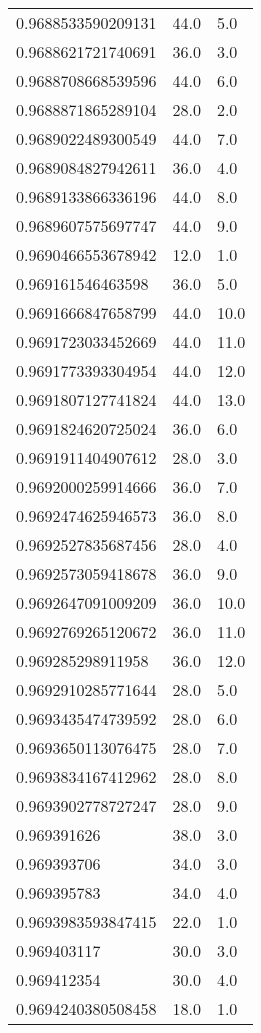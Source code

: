 \begin{center}
\begin{supertabular}[H]{p{0.30\textwidth}p{0.05\textwidth}p{0.05\textwidth}}
0.9688533590209131 & 44.0 & 5.0 \\ 
0.9688621721740691 & 36.0 & 3.0 \\ 
0.9688708668539596 & 44.0 & 6.0 \\ 
0.9688871865289104 & 28.0 & 2.0 \\ 
0.9689022489300549 & 44.0 & 7.0 \\ 
0.9689084827942611 & 36.0 & 4.0 \\ 
0.9689133866336196 & 44.0 & 8.0 \\ 
0.9689607575697747 & 44.0 & 9.0 \\ 
0.9690466553678942 & 12.0 & 1.0 \\ 
0.969161546463598 & 36.0 & 5.0 \\ 
0.9691666847658799 & 44.0 & 10.0 \\ 
0.9691723033452669 & 44.0 & 11.0 \\ 
0.9691773393304954 & 44.0 & 12.0 \\ 
0.9691807127741824 & 44.0 & 13.0 \\ 
0.9691824620725024 & 36.0 & 6.0 \\ 
0.9691911404907612 & 28.0 & 3.0 \\ 
0.9692000259914666 & 36.0 & 7.0 \\ 
0.9692474625946573 & 36.0 & 8.0 \\ 
0.9692527835687456 & 28.0 & 4.0 \\ 
0.9692573059418678 & 36.0 & 9.0 \\ 
0.9692647091009209 & 36.0 & 10.0 \\ 
0.9692769265120672 & 36.0 & 11.0 \\ 
0.969285298911958 & 36.0 & 12.0 \\ 
0.9692910285771644 & 28.0 & 5.0 \\ 
0.9693435474739592 & 28.0 & 6.0 \\ 
0.9693650113076475 & 28.0 & 7.0 \\ 
0.9693834167412962 & 28.0 & 8.0 \\ 
0.9693902778727247 & 28.0 & 9.0 \\ 
0.969391626 & 38.0 & 3.0 \\ 
0.969393706 & 34.0 & 3.0 \\ 
0.969395783 & 34.0 & 4.0 \\ 
0.9693983593847415 & 22.0 & 1.0 \\ 
0.969403117 & 30.0 & 3.0 \\ 
0.969412354 & 30.0 & 4.0 \\ 
0.9694240380508458 & 18.0 & 1.0 \\ 

\end{supertabular}
\end{center}
